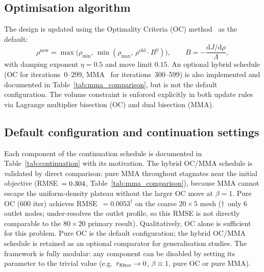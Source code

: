 \subsection{Optimisation algorithm}
The design is updated using the Optimality Criteria (OC)
method~\cite{bendsoe2003} as the default:
\begin{equation}
    \rho^{\mathrm{new}} = \max\!\bigl(\rho_{\min},\,
        \min(\rho_{\max},\,\rho^{\mathrm{old}} \cdot B^\eta)\bigr),
    \qquad B = -\frac{\mathrm{d}J/\mathrm{d}\rho}{\Lambda},
    \label{eq:oc}
\end{equation}
with damping exponent $\eta=0.5$ and move limit $0.15$.
An optional hybrid schedule (OC for iterations~0--299,
MMA~\cite{svanberg1987} for iterations~300--599) is also
implemented and documented in Table~\ref{tab:mma_comparison},
but is not the default configuration.
The volume constraint is enforced explicitly in both update rules
via Lagrange multiplier bisection (OC) and dual bisection (MMA).

\subsection{Default configuration and continuation settings}
\label{sec:default_config}
\label{sec:continuation}
Each component of the continuation schedule is documented
in Table~\ref{tab:continuation} with its motivation.
The hybrid OC/MMA schedule is validated by direct comparison:
pure MMA throughout stagnates near the initial objective
(RMSE~$=0.304$, Table~\ref{tab:mma_comparison}),
because MMA cannot escape the uniform-density plateau
without the larger OC move at $\beta=1$.
Pure OC (600 iter) achieves RMSE~$=0.0053^\dagger$ on the
coarse $20\times5$ mesh ($\dagger$~only 6 outlet nodes;
under-resolves the outlet profile, so this RMSE is not
directly comparable to the $80\times20$ primary result).
Qualitatively, OC alone is sufficient for this problem.
Pure OC is the default configuration;
the hybrid OC/MMA schedule is retained as an optional
comparator for generalisation studies.
The framework is fully modular: any component can be
disabled by setting its parameter to the trivial value
(e.g.\ $r_{\rm filter}\to0$, $\beta\equiv1$,
pure OC or pure MMA).

